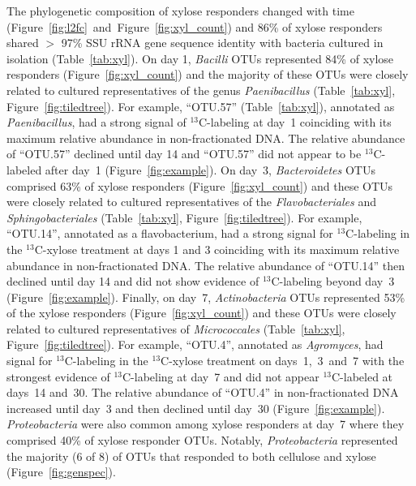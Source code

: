 The phylogenetic composition of xylose responders changed with time
(Figure~\ref{fig:l2fc}~and~Figure~\ref{fig:xyl_count}) and 86\% of xylose responders
shared $>$ 97\% SSU rRNA gene sequence identity with bacteria cultured in
isolation (Table~\ref{tab:xyl}). On day 1, \textit{Bacilli} OTUs represented
84\% of xylose responders (Figure~\ref{fig:xyl_count}) and the majority of
these OTUs were closely related to cultured representatives of the genus
\textit{Paenibacillus} (Table~\ref{tab:xyl}, Figure~\ref{fig:tiledtree}). For
example, ``OTU.57'' (Table~\ref{tab:xyl}), annotated as \textit{Paenibacillus},
had a strong signal of $^{13}$C-labeling at day~1 coinciding with its
maximum relative abundance in non-fractionated DNA. The relative abundance
of ``OTU.57'' declined until day 14 and ``OTU.57'' did not appear to be
$^{13}$C-labeled after day~1 (Figure~\ref{fig:example}). On day~3,
\textit{Bacteroidetes} OTUs comprised 63\% of xylose responders
(Figure~\ref{fig:xyl_count}) and these OTUs were closely related to
cultured representatives of the \textit{Flavobacteriales} and
\textit{Sphingobacteriales} (Table~\ref{tab:xyl},
Figure~\ref{fig:tiledtree}). For example, ``OTU.14'', annotated as
a flavobacterium, had a strong signal for $^{13}$C-labeling in the
$^{13}$C-xylose treatment at days 1 and 3 coinciding with its maximum
relative abundance in non-fractionated DNA. The relative abundance of
``OTU.14'' then declined until day 14 and did not show evidence of
$^{13}$C-labeling beyond day~3 (Figure~\ref{fig:example}). Finally, on
day~7, \textit{Actinobacteria} OTUs represented 53\% of the xylose
responders (Figure~\ref{fig:xyl_count}) and these OTUs were closely
related to cultured representatives of \textit{Micrococcales}
(Table~\ref{tab:xyl}, Figure~\ref{fig:tiledtree}). For example, ``OTU.4'',
annotated as \textit{Agromyces}, had signal for $^{13}$C-labeling in the
$^{13}$C-xylose treatment on days~1,~3~and~7 with the strongest evidence
of $^{13}$C-labeling at day~7 and did not appear $^{13}$C-labeled at
days~14 and~30. The relative abundance of ``OTU.4'' in non-fractionated
DNA increased until day~3 and then declined until day~30
(Figure~\ref{fig:example}). \textit{Proteobacteria} were also common among
xylose responders at day~7 where they comprised 40\% of xylose responder
OTUs. Notably, \textit{Proteobacteria} represented the majority (6 of 8)
of OTUs that responded to both cellulose and xylose
(Figure~\ref{fig:genspec}). 

